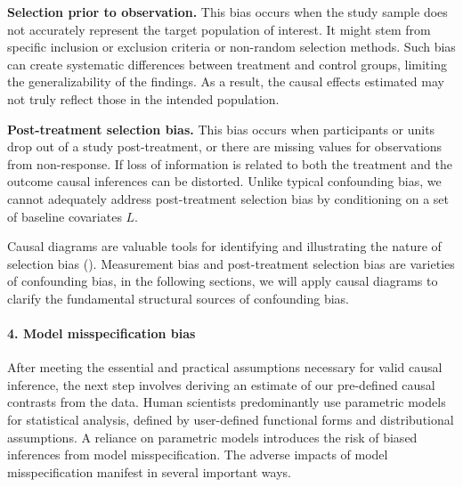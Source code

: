 \documentclass[
  singlecolumn,
  9pt]{article}
\let\oldparagraph\paragraph
\renewcommand{\paragraph}[1]{\oldparagraph{#1}\mbox{}}
\begin{document}
\textbf{Selection prior to observation.} This bias occurs when the study
sample does not accurately represent the target population of interest.
It might stem from specific inclusion or exclusion criteria or
non-random selection methods. Such bias can create systematic
differences between treatment and control groups, limiting the
generalizability of the findings. As a result, the causal effects
estimated may not truly reflect those in the intended population.

\textbf{Post-treatment selection bias.} This bias occurs when
participants or units drop out of a study post-treatment, or there are
missing values for observations from non-response. If loss of
information is related to both the treatment and the outcome causal
inferences can be distorted. Unlike typical confounding bias, we cannot
adequately address post-treatment selection bias by conditioning on a
set of baseline covariates \(L\).

Causal diagrams are valuable tools for identifying and illustrating the
nature of selection bias ().
Measurement bias and post-treatment selection bias are varieties of
confounding bias, in the following sections, we will apply causal
diagrams to clarify the fundamental structural sources of confounding
bias.

\paragraph{4. Model misspecification
bias}\label{model-misspecification-bias}

After meeting the essential and practical assumptions necessary for
valid causal inference, the next step involves deriving an estimate of
our pre-defined causal contrasts from the data. Human scientists
predominantly use parametric models for statistical analysis, defined by
user-defined functional forms and distributional assumptions. A reliance
on parametric models introduces the risk of biased inferences from model
misspecification. The adverse impacts of model misspecification manifest
in several important ways.
\end{document}
